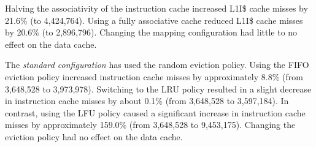 Halving the associativity of the instruction cache increased L1I\$ cache misses by 21.6\% (to 4,424,764). Using a fully associative cache reduced L1I\$ cache misses by 20.6\% (to
2,896,796). Changing the mapping configuration had little to no effect on the data cache.

The \textit{standard configuration} has used the random eviction policy. Using the FIFO eviction policy increased instruction cache misses by approximately 8.8\% (from 3,648,528
to 3,973,978). Switching to the LRU policy resulted in a slight decrease in instruction cache misses by about 0.1\% (from 3,648,528 to 3,597,184). In contrast, using the LFU policy
caused a significant increase in instruction cache misses by approximately 159.0\% (from 3,648,528 to 9,453,175). Changing the eviction policy had no effect on the data cache.
